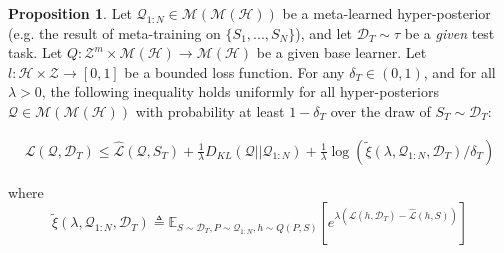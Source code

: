 \documentclass{article}
\theoremstyle{definition}
\newtheorem{proposition}[theorem]{Proposition}
\newcommand{\Expect}[2]{\mathbb{E}_{#1}\left [#2 \right ]}
\begin{document}
\begin{proposition}
	Let $\mathcal{Q}_{1:N}\in \mathcal{M}(\mathcal{M}(\mathcal{H}))$ be a meta-learned hyper-posterior (e.g. the result of meta-training on $\{S_1,...,S_N\}$), and let $\mathcal{D}_T\sim \tau$ be a \emph{given} test task. Let $Q: \mathcal{Z}^m\times\mathcal{M}(\mathcal{H})\rightarrow \mathcal{M}(\mathcal{H})$ be a given base learner. Let $l: \mathcal{H}\times \mathcal{Z}\rightarrow [0, 1]$ be a bounded loss function.
	For any $\delta_T \in (0,1)$, and for all $\lambda>0$, the following inequality holds uniformly for all hyper-posteriors $\mathcal{Q}\in \mathcal{M}(\mathcal{M}(\mathcal{H}))$ with probability at least $1-\delta_T$ over the draw of $S_T\sim \mathcal{D}_T$:
	
	\begin{align}
	\mathcal{L}(\mathcal{Q}, \mathcal{D}_T) \leq \hat{\mathcal{L}}(\mathcal{Q}, S_T) + \frac{1}{\lambda}D_{KL}(\mathcal{Q}||\mathcal{Q}_{1:N})
	+\frac{1}{\lambda}\log\left (\tilde{\xi}(\lambda,\mathcal{Q}_{1:N},\mathcal{D}_T)/\delta_T\right )
	\end{align}
	
	
	where 
	\begin{equation}\label{eq:tilde_xi}
	\tilde{\xi}(\lambda,\mathcal{Q}_{1:N},\mathcal{D}_T)\triangleq \Expect{S\sim \mathcal{D}_T, P\sim \mathcal{Q}_{1:N}, h\sim Q(P,S)}{e^{\lambda\left (\mathcal{L}(h, \mathcal{D}_T)-\hat{\mathcal{L}}(h, S)\right )}}
	\end{equation}
\end{proposition}
\end{document}
